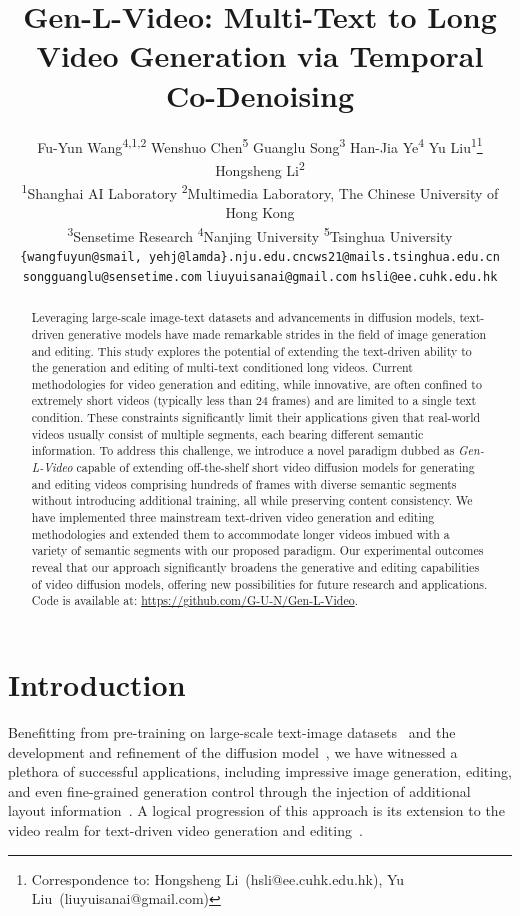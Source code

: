 \documentclass{article}
\title{Gen-L-Video: Multi-Text to Long Video Generation via Temporal Co-Denoising}
\author{Fu-Yun Wang\textsuperscript{4,1,2} \hspace{-3mm} \quad Wenshuo Chen\textsuperscript{5} \hspace{-3mm} \quad Guanglu Song\textsuperscript{3} \hspace{-3mm}\quad Han-Jia Ye\textsuperscript{4} \hspace{-3mm} \quad Yu Liu\textsuperscript{1}\thanks{Correspondence to: Hongsheng Li~(hsli@ee.cuhk.edu.hk), Yu Liu~(liuyuisanai@gmail.com)}\hspace{-2mm} \quad Hongsheng Li\textsuperscript{2}\footnotemark[2]\\
\textsuperscript{1}Shanghai AI Laboratory
\quad \textsuperscript{2}Multimedia Laboratory, The Chinese University of Hong Kong \\
\textsuperscript{3}Sensetime Research 
\quad \textsuperscript{4}Nanjing University
\quad \textsuperscript{5}Tsinghua University 
\\
\texttt{\{wangfuyun@smail, yehj@lamda\}.nju.edu.cn}\quad \texttt{cws21@mails.tsinghua.edu.cn}\\
\texttt{songguanglu@sensetime.com} \quad \texttt{liuyuisanai@gmail.com} \quad \texttt{hsli@ee.cuhk.edu.hk}
}
\begin{document}
\maketitle

\begin{abstract}
Leveraging large-scale image-text datasets and advancements in diffusion models, text-driven generative models have made remarkable strides in the field of image generation and editing. This study explores the potential of extending the text-driven ability to the generation and editing of multi-text conditioned long videos. Current methodologies for video generation and editing, while innovative, are often confined to extremely short videos (typically less than 24 frames) and are limited to a single text condition. These constraints significantly limit their applications given that real-world videos usually consist of multiple segments, each bearing different semantic information. To address this challenge, we introduce a novel paradigm dubbed as \textit{Gen-L-Video} capable of extending off-the-shelf short video diffusion models for generating and editing videos comprising hundreds of frames with diverse semantic segments without introducing additional training, all while preserving content consistency. We have implemented three mainstream text-driven video generation and editing methodologies and extended them to accommodate longer videos imbued with a variety of semantic segments with our proposed paradigm. Our experimental outcomes reveal that our approach significantly broadens the generative and editing capabilities of video diffusion models, offering new possibilities for future research and applications. Code is available at: \url{https://github.com/G-U-N/Gen-L-Video}.
\end{abstract}




\vspace{-1em}
\section{Introduction}
\vspace{-0.4em}
Benefitting from pre-training on large-scale text-image datasets~\cite{schuhmann2022laion} and the development and refinement of the diffusion model~\cite{nichol2021glide, ramesh2022hierarchical,ding2022cogview2, singer2022make, saharia2022photorealistic}, we have witnessed a plethora of successful applications, including impressive image generation, editing, and even fine-grained generation control through the injection of additional layout information~\cite{mou2023t2i,zhang2023adding}. A logical progression of this approach is its extension to the video realm for text-driven video generation and editing~\cite{singer2022make,qi2023fatezero,ho2022video,wu2022tune}.
\end{document}
